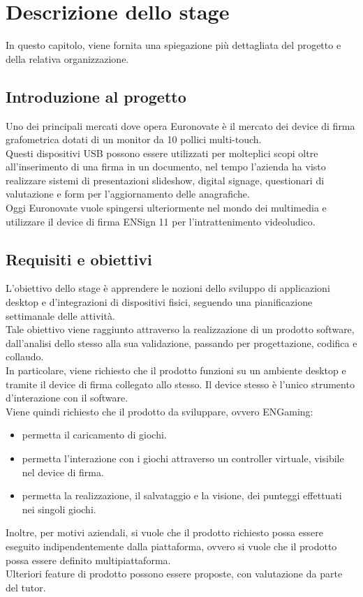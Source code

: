 \chapter{Descrizione dello stage}
\label{cap:descrizione-stage}

In questo capitolo, viene fornita una spiegazione più dettagliata del progetto e della relativa organizzazione.

\section{Introduzione al progetto}

Uno dei principali mercati dove opera Euronovate è il mercato dei device di firma grafometrica
dotati di un monitor da 10 pollici multi-touch.\\ Questi dispositivi USB possono essere utilizzati
per molteplici scopi oltre all'inserimento di una firma in un documento, nel tempo l'azienda ha visto
realizzare sistemi di presentazioni slideshow, digital signage, questionari di valutazione e form
per l'aggiornamento delle anagrafiche.\\ Oggi Euronovate vuole spingersi ulteriormente nel mondo dei
multimedia e utilizzare il device di firma ENSign 11 per l'intrattenimento videoludico.\\

\section{Requisiti e obiettivi}

L'obiettivo dello stage è apprendere le nozioni dello sviluppo di applicazioni desktop e d'integrazioni di dispositivi fisici, seguendo una pianificazione
settimanale delle attività.\\
Tale obiettivo viene raggiunto attraverso la realizzazione di un prodotto software, dall'analisi dello stesso alla sua validazione, passando per progettazione, codifica e collaudo.\\
In particolare, viene richiesto che il prodotto funzioni su un ambiente desktop e tramite il device di firma collegato allo stesso. Il device stesso è l'unico strumento d'interazione con il software.\\
Viene quindi richiesto che il prodotto da sviluppare, ovvero ENGaming:
\begin{itemize}
    \item permetta il caricamento di giochi.
    \item permetta l'interazione con i giochi attraverso un controller virtuale, visibile nel device di firma.
    \item permetta la realizzazione, il salvataggio e la visione, dei punteggi effettuati nei singoli giochi.
\end{itemize}
Inoltre, per motivi aziendali, si vuole che il prodotto richiesto possa essere eseguito indipendentemente dalla piattaforma, ovvero si vuole che il prodotto possa essere definito multipiattaforma.\\
Ulteriori feature di prodotto possono essere proposte, con valutazione da parte del tutor.

